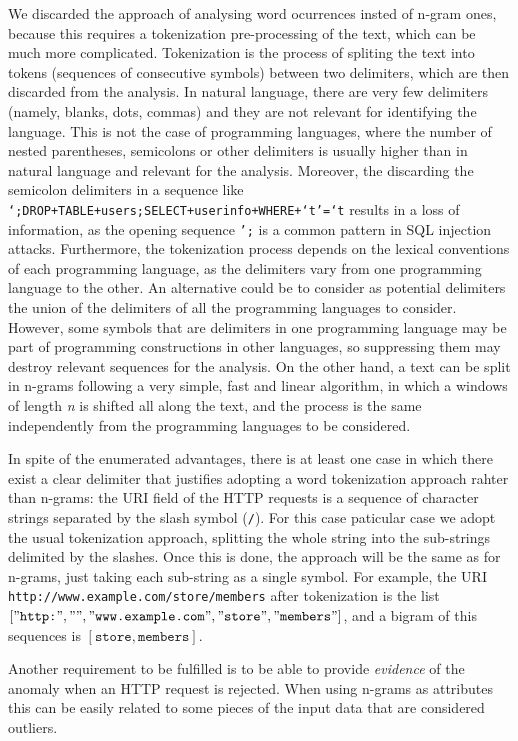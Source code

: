 \documentclass[runningheads,a4paper]{llncs}
\begin{document}
We discarded the approach of analysing word ocurrences insted of n-gram ones, because this requires a tokenization pre-processing of the text, which can be much more complicated. Tokenization is the process of spliting the text into tokens (sequences of consecutive symbols) between two delimiters, which are then discarded from the analysis. In natural language, there are very few delimiters (namely, blanks, dots, commas) and they are not relevant for identifying the language. This is not the case of programming languages, where the number of nested parentheses, semicolons or other delimiters is usually higher than in natural language and relevant for the analysis. Moreover, the discarding the semicolon delimiters in a sequence like \texttt{‘;DROP+TABLE+users;SELECT+userinfo+WHERE+‘t’=‘t} results in a loss of information, as the opening sequence \texttt{';} is a common pattern in SQL injection attacks. Furthermore, the tokenization process depends on the lexical conventions of each programming language, as the delimiters vary from one programming language to the other. An alternative could be to consider as potential delimiters the union of the delimiters of all the programming languages to consider. However, some symbols that are delimiters in one programming language may be part of programming constructions in other languages, so suppressing them may destroy relevant sequences for the analysis. On the other hand, a text can be split in n-grams following a very simple, fast and linear algorithm, in which a windows of length \textit{n} is shifted all along the text, and the process is the same independently from the programming languages to be considered.

In spite of the enumerated advantages, there is at least one case in which there exist a clear delimiter that justifies adopting a word tokenization approach rahter than n-grams: the URI field of the HTTP requests is a sequence of character strings separated by the slash symbol (\texttt{/}). For this case paticular case we adopt the usual tokenization approach, splitting the whole string into the sub-strings delimited by the slashes. Once this is done, the approach will be the same as for n-grams, just taking each sub-string as a single symbol. For example, the URI \texttt{http://www.example.com/store/members} after tokenization is the list $["\texttt{http:}", "\texttt{}", "\texttt{www.example.com}", "\texttt{store}", "\texttt{members}"]$, and a bigram of this sequences is $[\texttt{store},\texttt{members}]$.

Another requirement to be fulfilled is to be able to provide \textit{evidence} of the anomaly when an HTTP request is rejected. When using n-grams as attributes this can be easily related to some pieces of the input data that are considered outliers.
\end{document}
